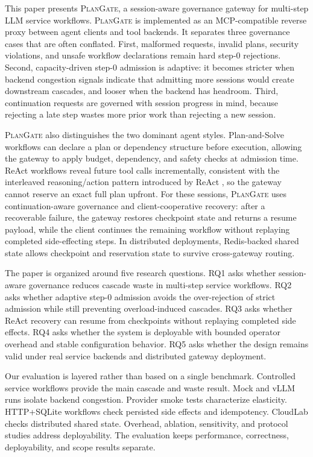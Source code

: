 \documentclass[5p,times]{elsarticle}
\newcommand{\plangate}{\textsc{PlanGate}\xspace}
\begin{document}
This paper presents \plangate, a session-aware governance gateway for multi-step LLM service workflows. \plangate is implemented as an MCP-compatible reverse proxy between agent clients and tool backends. It separates three governance cases that are often conflated. First, malformed requests, invalid plans, security violations, and unsafe workflow declarations remain hard step-0 rejections. Second, capacity-driven step-0 admission is adaptive: it becomes stricter when backend congestion signals indicate that admitting more sessions would create downstream cascades, and looser when the backend has headroom. Third, continuation requests are governed with session progress in mind, because rejecting a late step wastes more prior work than rejecting a new session.

\plangate also distinguishes the two dominant agent styles. Plan-and-Solve workflows can declare a plan or dependency structure before execution, allowing the gateway to apply budget, dependency, and safety checks at admission time. ReAct workflows reveal future tool calls incrementally, consistent with the interleaved reasoning/action pattern introduced by ReAct \citep{yao2023react}, so the gateway cannot reserve an exact full plan upfront. For these sessions, \plangate uses continuation-aware governance and client-cooperative recovery: after a recoverable failure, the gateway restores checkpoint state and returns a resume payload, while the client continues the remaining workflow without replaying completed side-effecting steps. In distributed deployments, Redis-backed shared state allows checkpoint and reservation state to survive cross-gateway routing.

The paper is organized around five research questions. RQ1 asks whether session-aware governance reduces cascade waste in multi-step service workflows. RQ2 asks whether adaptive step-0 admission avoids the over-rejection of strict admission while still preventing overload-induced cascades. RQ3 asks whether ReAct recovery can resume from checkpoints without replaying completed side effects. RQ4 asks whether the system is deployable with bounded operator overhead and stable configuration behavior. RQ5 asks whether the design remains valid under real service backends and distributed gateway deployment.

Our evaluation is layered rather than based on a single benchmark. Controlled service workflows provide the main cascade and waste result. Mock and vLLM runs isolate backend congestion. Provider smoke tests characterize elasticity. HTTP+SQLite workflows check persisted side effects and idempotency. CloudLab checks distributed shared state. Overhead, ablation, sensitivity, and protocol studies address deployability. The evaluation keeps performance, correctness, deployability, and scope results separate.
\end{document}
